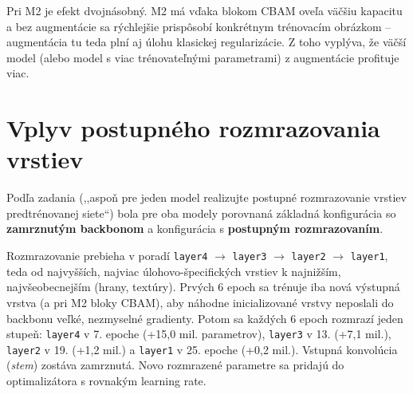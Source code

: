 Pri M2 je efekt dvojnásobný. M2 má vďaka blokom CBAM oveľa väčšiu
kapacitu a bez augmentácie sa rýchlejšie prispôsobí konkrétnym trénovacím
obrázkom -- augmentácia tu teda plní aj úlohu klasickej regularizácie.
Z toho vyplýva, že väčší model (alebo model s viac trénovateľnými
parametrami) z augmentácie profituje viac.



\section{Vplyv postupného rozmrazovania vrstiev}
\label{sec:unfreeze}

Podľa zadania (,,aspoň pre jeden model realizujte postupné rozmrazovanie
vrstiev predtrénovanej siete``) bola pre oba modely porovnaná základná
konfigurácia so \textbf{zamrznutým backbonom} a konfigurácia
s \textbf{postupným rozmrazovaním}.

Rozmrazovanie prebieha v poradí \texttt{layer4} $\rightarrow$
\texttt{layer3} $\rightarrow$ \texttt{layer2} $\rightarrow$ \texttt{layer1},
teda od najvyšších, najviac úlohovo-špecifických vrstiev k najnižším,
najvšeobecnejším (hrany, textúry). Prvých 6 epoch sa trénuje iba nová
výstupná vrstva (a pri M2 bloky CBAM), aby náhodne inicializované vrstvy
neposlali do backbonu veľké, nezmyselné gradienty. Potom sa každých
6 epoch rozmrazí jeden stupeň: \texttt{layer4} v 7. epoche (+15,0 mil.
parametrov), \texttt{layer3} v 13. (+7,1 mil.), \texttt{layer2} v 19.
(+1,2 mil.) a \texttt{layer1} v 25. epoche (+0,2 mil.). Vstupná konvolúcia
(\emph{stem}) zostáva zamrznutá. Novo rozmrazené parametre sa pridajú do
optimalizátora s rovnakým learning rate.

